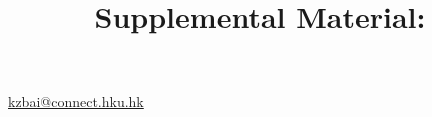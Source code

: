 \documentclass[aps,prl,reprint,onecolumn,11pt,tightenlines,superscriptaddress,floatfix]{revtex4-2}
\begin{document}
\raggedbottom\title{Supplemental Material: \ManuscriptTitle}

\maketitle
\begin{center}\small\href{mailto:kzbai@connect.hku.hk}{kzbai@connect.hku.hk}\end{center}
\LayoutAudit

\end{document}
